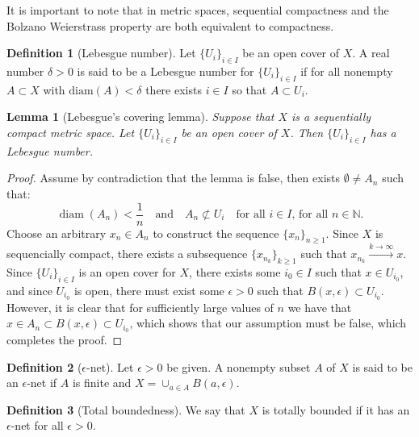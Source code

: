\documentclass[11pt,a4paper]{article}
\theoremstyle{definition}
\newtheorem{definition}{Definition}[section]
\theoremstyle{plain}
\newtheorem{lemma}[theorem]{Lemma}
\DeclareMathOperator{\diam}{diam}
\newcommand{\N}{\mathbb{N}}
\newcommand{\tand}{\quad \text{and} \quad}
\begin{document}
  It is important to note that in metric spaces, sequential compactness and 
  the Bolzano Weierstrass property are both
  equivalent to compactness.
  
  \begin{definition}[Lebesgue number]
    Let $\{U_i\}_{i \in I}$ be an open cover of $X$. A real number 
    $\delta > 0$ is said to be a Lebesgue number
    for $\{U_i\}_{i \in I}$
    if for all nonempty $A \subset X$ with $\text{diam}(A) < \delta$
    there exists $i \in I$ so that $A \subset U_i$.
  \end{definition}

  \begin{lemma}[Lebesgue’s covering lemma]
    Suppose that $X$ is a sequentially compact metric space. 
    Let $\{U_i\}_{i \in I}$ be an open cover of $X$. 
    Then $\{U_i\}_{i \in I}$ has a Lebesgue number.
  \end{lemma}
  \begin{proof}
    Assume by contradiction that the lemma is false, 
    then exists $\emptyset \neq A_n$ such that:
    \[
      \diam(A_n) < \frac{1}{n} \tand A_n \not\subset U_i 
      \quad\text{for all $i \in I$, for all $n \in \N$}.
    \]
    Choose an arbitrary $x_n \in A_n$ to construct the sequence 
    $\{x_n\}_{n \geq 1}$.
    Since $X$ is sequencially compact, there exists a subsequence
    $\{x_{n_k}\}_{k \geq 1}$ such that $x_{n_k} \xrightarrow{k \to \infty} x$.
    Since $\{U_i\}_{i \in I}$ is an open cover for $X$, there exists
    some $i_0 \in I$ such that $x \in U_{i_0}$, and since $U_{i_0}$ is open,
    there must exist some $\epsilon > 0$ such that 
    $B(x,\epsilon) \subset U_{i_0}$.
    However, it is clear that for sufficiently large values of $n$ we have
    that $x \in A_n \subset B(x,\epsilon) \subset U_{i_0}$, which shows
    that our assumption must be false, which completes the proof.
  \end{proof}

  \begin{definition}[$\epsilon$-net]
    Let $\epsilon > 0$ be given. A nonempty subset $A$ of $X$ is 
    said to be an $\epsilon$-net if $A$ is finite and 
    $X = \cup_{a \in A}{B(a, \epsilon)}$.
  \end{definition}

  \begin{definition}[Total boundedness]
    We say that $X$ is totally bounded if it has an $\epsilon$-net 
    for all $\epsilon > 0$.
  \end{definition}
\end{document}
